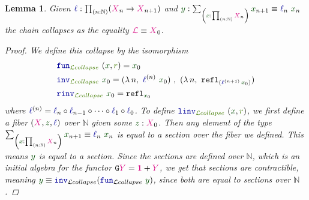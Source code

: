 \documentclass[twoside,11pt,openright]{report}
\theoremstyle{plain} %
\newtheorem{lem}[thm]{Lemma}
\theoremstyle{definition}
\theoremstyle{remark}
\newcommand*{\term}[1]{\textcolor{green!30!black}{#1}} %
\newcommand*{\pathterm}[1]{\textcolor{green!65!red!75!black}{#1}}
\newcommand*{\type}[1]{\textcolor{magenta!90!black}{#1}}
\newcommand*{\unit}{\type{\textbf{1}}}
\newcommand*{\function}[1]{\textcolor{blue!60!black}{\ensuremath{\mathtt{#1}}}}
\newcommand*{\functor}[1]{\ensuremath{\mathbf{\mathtt{#1}}}}
\begin{document}
\begin{lem}\label{lem:limit-collapse}
  Given \(\function{\ell} : \prod_{(n : \mathbb{N})} (\type{X}_{n} \rightarrow \type{X}_{n+1})\) and \(\term{y} : \sum_{\left(\term{x} : \prod_{(n : \mathbb{N})} \type{X}_n\right)} \term{x}_{n + 1} \equiv \function{\ell}_n~\term{x}_n\) the chain collapses as the equality \(\type{\mathcal{L}} \equiv \type{X}_0\).
  \begin{proof}
    We define this collapse by the isomorphism
    \begin{align}
      &\function{fun}_{\pathterm{\mathcal{L}collapse}}~(\term{x} , \pathterm{r}) = \term{x}_0 \\
      &\function{inv}_{\pathterm{\mathcal{L}collapse}}~\term{x}_0 = (\lambda\,n,~\function{\ell}^{(n)}~\term{x}_0)~,~(\lambda\,n,~\mathtt{refl}_{(\function{\ell}^{(n+1)}\,\term{x}_0)}) \\
      &\function{rinv}_{\pathterm{\mathcal{L}collapse}}~\term{x}_0 = \mathtt{refl}_{\term{x}_0}
    \end{align}
    where \(\function{\ell}^{(n)} = \function{\ell}_n \circ \function{\ell}_{n-1} \circ \dots \circ \function{\ell}_1 \circ \function{\ell}_0\). To define \(\function{linv}_{\pathterm{\mathcal{L}collapse}}~(\term{x} , \pathterm{r})\), we first define a fiber \((\type{X} , \term{z}, \function{\ell})\) over \(\mathbb{N}\) given some \(\term{z} : \type{X}_0\). Then any element of the type \(\sum_{\left(\term{x} : \prod_{(n : \mathbb{N})} \type{X}_n\right)} \term{x}_{n + 1} \equiv \function{\ell}_n~\term{x}_n\) is equal to a section over the fiber we defined. This means \(\term{y}\) is equal to a section. Since the sections are defined over \(\mathbb{N}\), which is an initial algebra for the functor \(\functor{G}\type{Y} = \unit + \type{Y}\), we get that sections are contractible, meaning \(\term{y} \equiv \function{inv}_{\mathcal{L}collapse} (\function{fun}_{\mathcal{L}collapse}~\term{y})\), since both are equal to sections over \(\mathbb{N}\).
\end{proof}
\end{lem}
\end{document}

